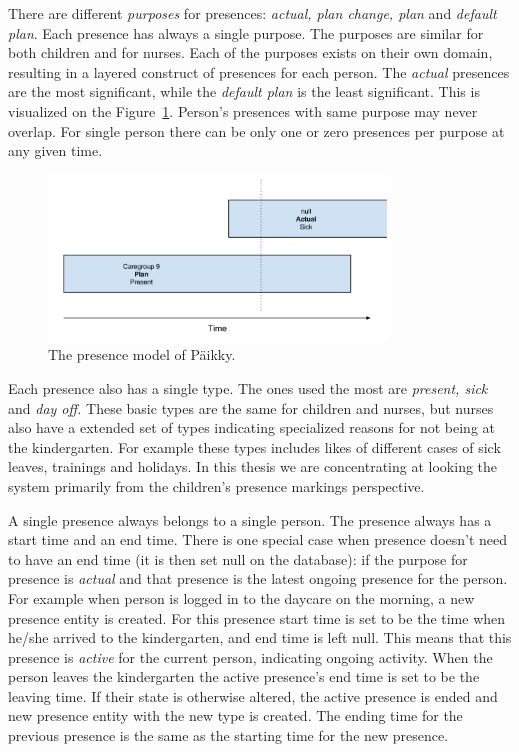 There are different \textit{purposes} for presences: \textit{actual, plan change, plan} and \textit{default plan}. Each presence has always a single purpose. The purposes are similar for both children and for nurses. Each of the purposes exists on their own domain, resulting in a layered construct of presences for each person. The \textit{actual} presences are the most significant, while the \textit{default plan} is the least significant. This is visualized on the Figure~\ref{fig:presencemodel}. Person's presences with same purpose may never overlap. For single person there can be only one or zero presences per purpose at any given time.

\begin{figure}[t]
\begin{center}
\includegraphics[width=0.8\textwidth]{assets/presencemodel.png}
\end{center}
\caption{The presence model of Päikky.}
\label{fig:presencemodel}
\end{figure}


Each presence also has a single type. The ones used the most are \textit{present, sick} and \textit{day off.} These basic types are the same for children and nurses, but nurses also have a extended set of types indicating specialized reasons for not being at the kindergarten. For example these types includes likes of different cases of sick leaves, trainings and holidays. In this thesis we are concentrating at looking the system primarily from the children's presence markings perspective.

A single presence always belongs to a single person. The presence always has a start time and an end time. There is one special case when presence doesn't need to have an end time (it is then set null on the database): if the purpose for presence is \textit{actual} and that presence is the latest ongoing presence for the person. For example when person is logged in to the daycare on the morning, a new presence entity is created. For this presence start time is set to be the time when he/she arrived to the kindergarten, and end time is left null. This means that this presence is \textit{active} for the current person, indicating ongoing activity. When the person leaves the kindergarten the active presence's end time is set to be the leaving time. If their state is otherwise altered, the active presence is ended and new presence entity with the new type is created. The ending time for the previous presence is the same as the starting time for the new presence. 



